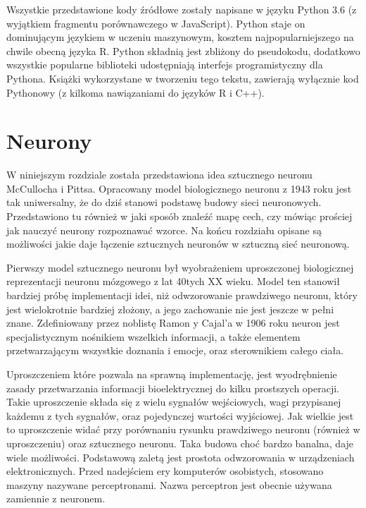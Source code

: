 \documentclass[12pt,a4paper,twoside,titlepage,openright]{book}
\begin{document}
Wszystkie przedstawione kody źródłowe zostały napisane w języku Python 3.6 (z wyjątkiem fragmentu porównawczego w JavaScript). Python staje on dominującym językiem w uczeniu maszynowym, kosztem najpopularniejszego na chwile obecną języka R. Python składnią jest zbliżony do pseudokodu, dodatkowo wszystkie popularne biblioteki udostępniają interfejs programistyczny dla Pythona. Książki wykorzystane w tworzeniu tego tekstu, zawierają wyłącznie kod Pythonowy (z kilkoma nawiązaniami do języków R i C++).


\chapter{Neurony}
W niniejszym rozdziale została przedstawiona idea sztucznego neuronu McCullocha i Pittsa. Opracowany model biologicznego neuronu z 1943 roku jest tak uniwersalny, że do dziś stanowi podstawę budowy sieci neuronowych. Przedstawiono tu również w jaki sposób znaleźć mapę cech, czy mówiąc prościej jak nauczyć neurony rozpoznawać wzorce. Na końcu rozdziału opisane są możliwości jakie daje łączenie sztucznych neuronów w sztuczną sieć neuronową.

Pierwszy model sztucznego neuronu był wyobrażeniem uproszczonej biologicznej reprezentacji neuronu mózgowego z lat 40tych XX wieku. Model ten stanowił bardziej próbę implementacji idei, niż odwzorowanie prawdziwego neuronu, który jest wielokrotnie bardziej złożony, a jego zachowanie nie jest jeszcze w pełni znane. Zdefiniowany przez noblistę Ramon y Cajal'a w 1906 roku neuron jest specjalistycznym nośnikiem wszelkich informacji, a także elementem przetwarzającym wszystkie doznania i emocje, oraz sterownikiem całego ciała. 

Uproszczeniem które pozwala na sprawną implementację, jest wyodrębnienie zasady przetwarzania informacji bioelektrycznej do kilku prostszych operacji. Takie uproszczenie składa się z wielu sygnałów wejściowych, wagi przypisanej każdemu z tych sygnałów, oraz pojedynczej wartości wyjściowej. Jak wielkie jest to uproszczenie widać przy porównaniu rysunku prawdziwego neuronu (również w uproszczeniu) oraz sztucznego neuronu. Taka budowa choć bardzo banalna, daje wiele możliwości. Podstawową zaletą jest prostota odwzorowania w urządzeniach elektronicznych. Przed nadejściem ery komputerów osobistych, stosowano maszyny nazywane perceptronami. Nazwa perceptron jest obecnie używana zamiennie z neuronem.
\end{document}

